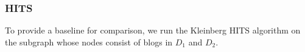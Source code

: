 \documentclass{sig-alternate}
\begin{document}
\subsubsection{HITS}
To provide a baseline for comparison, we run the Kleinberg HITS
algorithm on the subgraph whose nodes consist of blogs in $D_1$ and
$D_2$.




\end{document}

